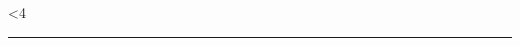 \documentclass{article}
\newcounter{ctr}
\newcounter{ctra}
\newlength\rwidth
\begin{document}
\begin{center}
\loop
\ifnum\thectr<4
\fbox{\thectra}\colorbox{gray}{\color{olive}\rule{\the\rwidth}{30pt} }\\[-1.0pt]
\addtocounter{ctra}{7}
  \setlength\rwidth{\dimexpr\the\rwidth+30pt\relax}
\repeat
\end{center}
\end{document}
